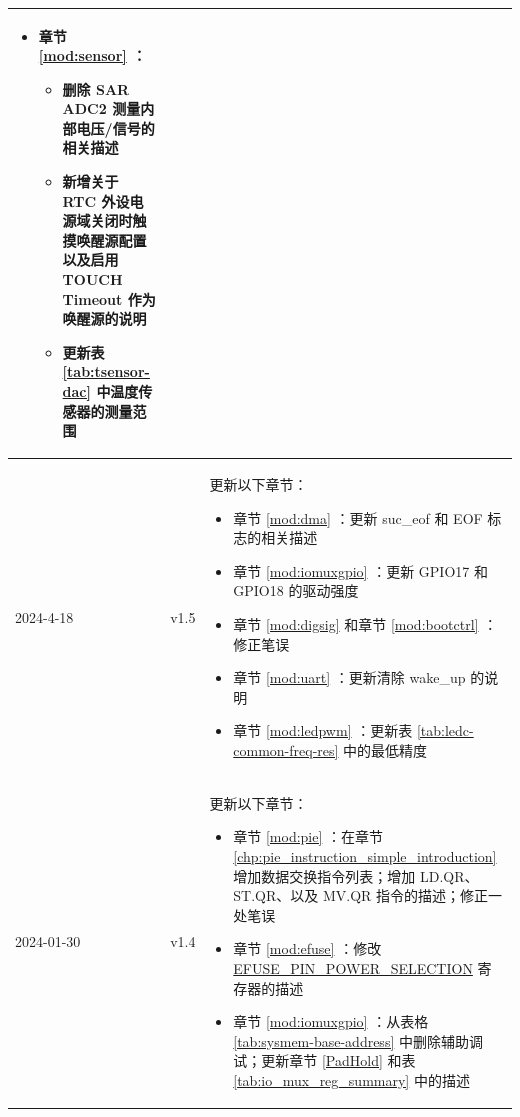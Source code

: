 \begin{longtable}[l]{ | m{2cm} | m{1.5cm} | m{12cm} | }
\begin{itemize}
            \item 章节 \ref{mod:sensor} \textit{\nameref{mod:sensor}}：
                \begin{itemize}
                    \item 删除 SAR ADC2 测量内部电压/信号的相关描述 %
                    \item 新增关于 RTC 外设电源域关闭时触摸唤醒源配置以及启用 TOUCH Timeout 作为唤醒源的说明 %
                    \item 更新表 \ref{tab:tsensor-dac} \textit{\nameref{tab:tsensor-dac}} 中温度传感器的测量范围 %
                \end{itemize}
        \end{itemize}
    \\\hline
    2024-4-18 & v1.5 &
    更新以下章节：
        \begin{itemize}
            \item 章节 \ref{mod:dma} \textit{\nameref{mod:dma}}：更新 suc\_eof 和 EOF 标志的相关描述 %
            \item 章节 \ref{mod:iomuxgpio} \textit{\nameref{mod:iomuxgpio}}：更新 GPIO17 和 GPIO18 的驱动强度 %
            \item 章节 \ref{mod:digsig} \textit{\nameref{mod:digsig}} 和章节 \ref{mod:bootctrl} \textit{\nameref{mod:bootctrl}}：修正笔误 %
            \item 章节 \ref{mod:uart} \textit{\nameref{mod:uart}}：更新清除 wake\_up 的说明 %
            \item 章节 \ref{mod:ledpwm} \textit{\nameref{mod:ledpwm}}：更新表 \ref{tab:ledc-common-freq-res} 中的最低精度  %
        \end{itemize}
    \\\hline
    2024-01-30     & v1.4  &
    更新以下章节：
    \begin{itemize}
        \item 章节 \ref{mod:pie} \textit{\nameref{mod:pie}}：在章节 \ref{chp:pie_instruction_simple_introduction} 增加数据交换指令列表；增加 LD.QR、ST.QR、以及 MV.QR 指令的描述；修正一处笔误 %
        \item 章节 \ref{mod:efuse} \textit{\nameref{mod:efuse}}：修改 \hyperref[fielddesc:EFUSEPINPOWERSELECTION]{EFUSE\_PIN\_POWER\_SELECTION} 寄存器的描述 %
        \item 章节 \ref{mod:iomuxgpio} \textit{\nameref{mod:iomuxgpio}}：从表格 \ref{tab:sysmem-base-address} 中删除辅助调试；更新章节 \ref{PadHold} 和表 \ref{tab:io_mux_reg_summary} 中的描述 %

\end{itemize}
\end{longtable}
